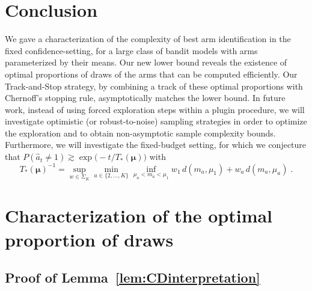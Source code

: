 \documentclass{colt2016} %
\begin{document}
\section{Conclusion}
We gave a characterization of the complexity of best arm identification in the fixed confidence-setting, for a large class of bandit models with arms parameterized by their means. Our new lower bound reveals the existence of optimal proportions of draws of the arms that can be computed efficiently. Our  Track-and-Stop strategy, by combining a track of these optimal proportions with Chernoff's stopping rule, asymptotically matches the lower bound. In future work, instead of using forced exploration steps within a plugin procedure, we will investigate optimistic (or robust-to-noise) sampling strategies in order to optimize the exploration and to obtain non-asymptotic sample complexity bounds. Furthermore, we will investigate the fixed-budget setting, for which we conjecture that $P(\hat{a}_t \neq 1) \gtrsim \exp\big(-t/T_*(\bm\mu)\big)$ with
\[T_*(\bm\mu)^{-1}  = \sup_{w\in\Sigma_K} \min_{a\in\{2,\dots,K\}} \inf_{\mu_a<m_a<\mu_1} w_1\, d(m_a, \mu_1) + w_a\, d(m_a, \mu_a)\;.\]




\appendix


\section{Characterization of the optimal proportion of draws}\label{proofs:Nu}

\subsection{Proof of Lemma~\ref{lem:CDinterpretation}}
\end{document}
